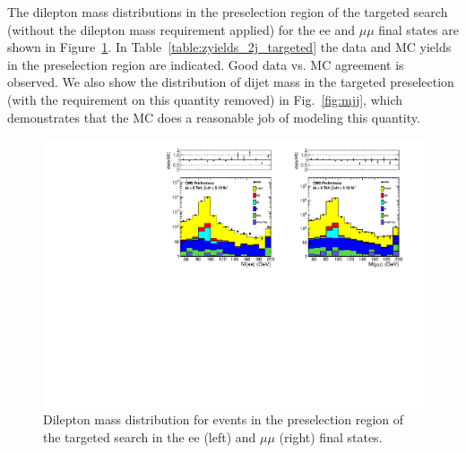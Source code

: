 The dilepton mass distributions in the preselection region of the targeted search (without the dilepton mass requirement applied) 
for the ee and $\mu\mu$ final states are shown in Figure~\ref{fig:dilmass_2j_targeted}. In Table~\ref{table:zyields_2j_targeted} 
the data and MC yields in the preselection region are indicated. Good data vs. MC agreement is observed.
We also show the distribution of dijet mass in the targeted preselection (with the requirement on this quantity removed) in Fig.~\ref{fig:mjj},
which demonstrates that the MC does a reasonable job of modeling this quantity.

\begin{figure}[hbt]
  \begin{center}
	\includegraphics[width=1.0\linewidth]{plots/dilmass_ee_mm_2j_targeted.pdf}
	\caption{
	  \label{fig:dilmass_2j_targeted}\protect 
	  Dilepton mass distribution for events in the preselection region of the targeted search
	  in the ee (left) and $\mu\mu$ (right) final states.}
  \end{center}
\end{figure}

